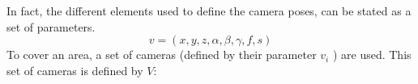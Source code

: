 % 
In fact, the different elements used to define the camera poses, can be stated as a set of parameters.\\
 
\begin{equation}\label{eq:v}
v=(x,y,z,\alpha ,\beta,\gamma,f,s)
\end{equation}
To cover an area, a set of cameras (defined by their parameter $v_i$ ) are used. This set of cameras is defined by $V$:


